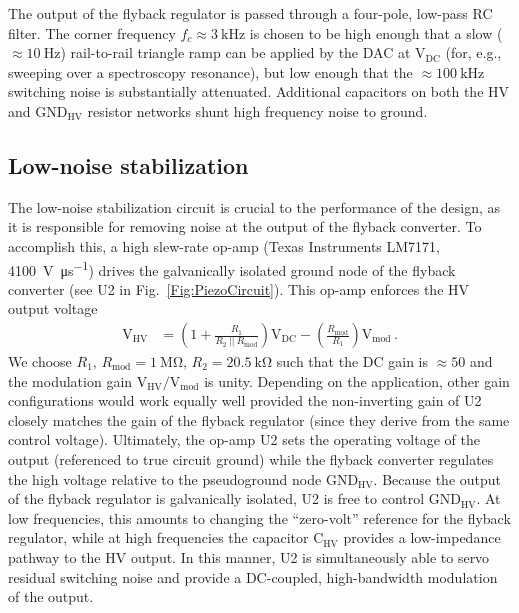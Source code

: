 \documentclass[aip,rsi,reprint]{revtex4-1} %
\begin{document}
The output of the flyback regulator is passed through a four-pole, low-pass RC filter.
The corner frequency $f_c \approx \SI{3}{\kilo\hertz}$ is chosen to be high enough that a slow ($\approx \SI{10}{\hertz}$) rail-to-rail triangle ramp can be applied by the DAC at $\text{V}_\text{DC}$ (for, e.g., sweeping over a spectroscopy resonance), but low enough that the $\approx \SI{100}{\kilo\hertz}$ switching noise is substantially attenuated.
Additional capacitors on both the HV and $\text{GND}_{\text{HV}}$ resistor networks shunt high frequency noise to ground.

\subsection{Low-noise stabilization}
\label{Sec:LowNoiseStabilization}

The low-noise stabilization circuit is crucial to the performance of the design, as it is responsible for removing noise at the output of the flyback converter.
To accomplish this, a high slew-rate op-amp (Texas Instruments LM7171, \SI[per-mode=symbol]{4100}{\volt\per\micro\second}) drives the galvanically isolated ground node of the flyback converter (see U2 in Fig.~\ref{Fig:PiezoCircuit}).
This op-amp enforces the HV output voltage
\begin{align}
\text{V}_\text{HV} &= \left(1 + \frac{R_1}{R_2~||~R_\text{mod}}\right) \text{V}_\text{DC} -
\left(\frac{R_\text{mod}}{R_1}\right) \text{V}_\text{mod}\,.
\label{Eq:FullTransferFunc}
\end{align}
We choose $R_1,\,R_\text{mod} = \SI{1}{\mega\ohm}$, $R_2 = \SI{20.5}{\kilo\ohm}$ such that the DC gain is $\approx 50$ and the modulation gain $\text{V}_\text{HV}/\text{V}_\text{mod}$ is unity.
Depending on the application, other gain configurations would work equally well provided the non-inverting gain of U2 closely matches the gain of the flyback regulator (since they derive from the same control voltage).
Ultimately, the op-amp U2 sets the operating voltage of the output (referenced to true circuit ground) while the flyback converter regulates the high voltage relative to the pseudoground node $\text{GND}_\text{HV}$.
Because the output of the flyback regulator is galvanically isolated, U2 is free to control $\text{GND}_\text{HV}$. 
At low frequencies, this amounts to changing the ``zero-volt'' reference for the flyback regulator, while at high frequencies the capacitor $\text{C}_\text{HV}$ provides a low-impedance pathway to the HV output.
In this manner, U2 is simultaneously able to servo residual switching noise and provide a DC-coupled, high-bandwidth modulation of the output.
\end{document}
